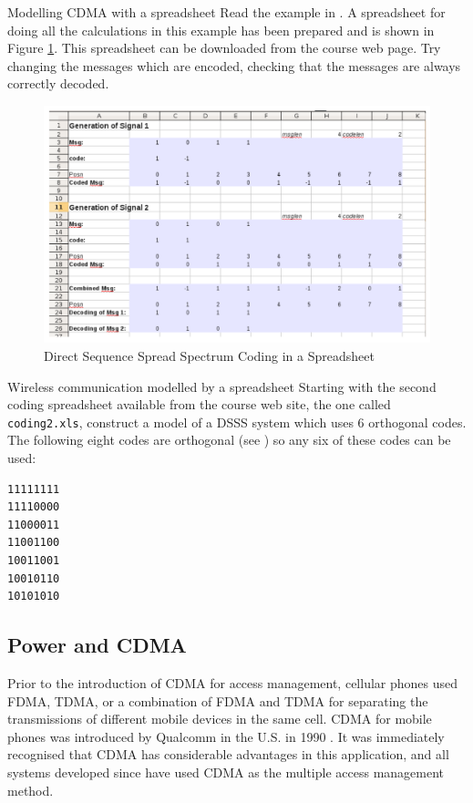 \begin{sbexample}{Modelling CDMA with a spreadsheet}%
Read the example in \cite{cdmawiki}. A spreadsheet for doing all the
calculations in this example has been prepared and is shown in Figure
\ref{cdmaspread}. This spreadsheet can be downloaded from the course
web page. Try changing the messages which are encoded, checking that
the messages are always correctly decoded.

\begin{figure}
\begin{center}
\includegraphics[width=15 cm]{cdmaspreadsheet.png}
\caption{Direct Sequence Spread Spectrum Coding in a Spreadsheet}\label{cdmaspread}
\end{center}
\end{figure}
\end{sbexample}

\begin{exercise}{Wireless communication modelled by a spreadsheet}
Starting with the second coding spreadsheet available from the course
web site, the one called \verb|coding2.xls|, construct a model of a
DSSS system which uses 6 orthogonal codes. The following eight codes
are orthogonal (see \cite{wolframwalsh}) so any six of these codes can
be used:

\begin{verbatim}
11111111
11110000
11000011
11001100
10011001
10010110
10101010
\end{verbatim}

\end{exercise}

\subsection{Power and CDMA}
Prior to the introduction of CDMA for access management, cellular
phones used FDMA, TDMA, or a combination of FDMA and TDMA for
separating the transmissions of different mobile devices in the same
cell. CDMA for mobile phones was introduced by Qualcomm in the U.S. in
1990 \cite{qualcommwiki}. It was immediately recognised that CDMA has
considerable advantages in this application, and all systems developed
since have used CDMA as the multiple access management method.

